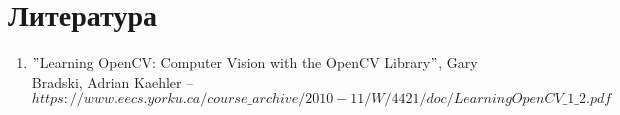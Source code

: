 \section{Литература}

\begin{enumerate}
	\item $"$Learning OpenCV: Computer Vision with the OpenCV Library$"$, Gary Bradski, Adrian Kaehler -- $https://www.eecs.yorku.ca/course\_archive/2010-11/W/4421/doc/LearningOpenCV\_1\_2.pdf$
\end{enumerate}